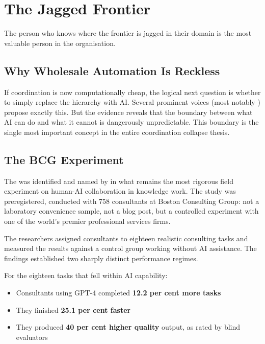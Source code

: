 \chapter{The Jagged Frontier}
\label{ch:jagged-frontier}

\epigraph{The person who knows where the frontier is jagged in their domain is the most valuable person in the organisation.}{}

\section{Why Wholesale Automation Is Reckless}

If coordination is now computationally cheap, the logical next question is whether to simply replace the hierarchy with AI. Several prominent voices (most notably \textcite{DorseyBotha2026}) propose exactly this. But the evidence reveals that the boundary between what AI can do and what it cannot is dangerously unpredictable. This boundary is the single most important concept in the entire coordination collapse thesis.

\section{The BCG Experiment}

The  was identified and named by \textcite{DellAcqua2026} in what remains the most rigorous field experiment on human-AI collaboration in knowledge work. The study was preregistered, conducted with 758 consultants at Boston Consulting Group: not a laboratory convenience sample, not a blog post, but a controlled experiment with one of the world's premier professional services firms.

The researchers assigned consultants to eighteen realistic consulting tasks and measured the results against a control group working without AI assistance. The findings established two sharply distinct performance regimes.

\begin{evidencebox}[title={Inside the Frontier}]
For the eighteen tasks that fell within AI capability:
\begin{itemize}
  \item Consultants using GPT-4 completed \textbf{12.2 per cent more tasks}
  \item They finished \textbf{25.1 per cent faster}
  \item They produced \textbf{40 per cent higher quality} output, as rated by blind evaluators
\end{itemize}
\end{evidencebox}

